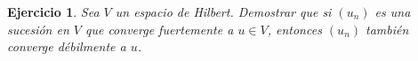 \documentclass[11pt]{report}
\newtheorem{ex}{Ejercicio}
\newenvironment{solution}{\begin{proof}[Solución]}{\end{proof}}
\newcommand{\inner}[2]{( #1, #2 )_V}
\newcommand{\norma}[1]{\Vert #1 \Vert_V}
\begin{document}

\begin{ex}
Sea $V$ un espacio de Hilbert. Demostrar que si $(u_n)$ es una sucesión en $V$ que converge fuertemente a $u \in V$, entonces $(u_n)$ también converge débilmente a $u$.
\end{ex}



\end{document}
